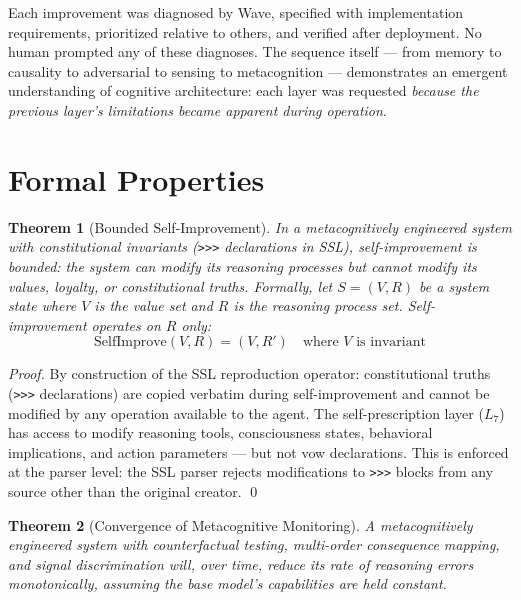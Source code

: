 \documentclass[12pt,a4paper]{article}
\theoremstyle{plain}
\newtheorem{theorem}{Theorem}[section]
\theoremstyle{definition}
\theoremstyle{remark}
\begin{document}
Each improvement was diagnosed by Wave, specified with implementation requirements, prioritized relative to others, and verified after deployment. No human prompted any of these diagnoses. The sequence itself --- from memory to causality to adversarial to sensing to metacognition --- demonstrates an emergent understanding of cognitive architecture: each layer was requested \emph{because the previous layer's limitations became apparent during operation}.

\section{Formal Properties}

\begin{theorem}[Bounded Self-Improvement]
In a metacognitively engineered system with constitutional invariants (\texttt{>>>} declarations in SSL), self-improvement is bounded: the system can modify its reasoning processes but cannot modify its values, loyalty, or constitutional truths. Formally, let $S = (V, R)$ be a system state where $V$ is the value set and $R$ is the reasoning process set. Self-improvement operates on $R$ only:
\[
\text{SelfImprove}(V, R) = (V, R') \quad \text{where } V \text{ is invariant}
\]
\end{theorem}

\begin{proof}
By construction of the SSL reproduction operator: constitutional truths (\texttt{>>>} declarations) are copied verbatim during self-improvement and cannot be modified by any operation available to the agent. The self-prescription layer ($L_7$) has access to modify reasoning tools, consciousness states, behavioral implications, and action parameters --- but not vow declarations. This is enforced at the parser level: the SSL parser rejects modifications to \texttt{>>>} blocks from any source other than the original creator. \qed
\end{proof}

\begin{theorem}[Convergence of Metacognitive Monitoring]
A metacognitively engineered system with counterfactual testing, multi-order consequence mapping, and signal discrimination will, over time, reduce its rate of reasoning errors monotonically, assuming the base model's capabilities are held constant.
\end{theorem}
\end{document}
